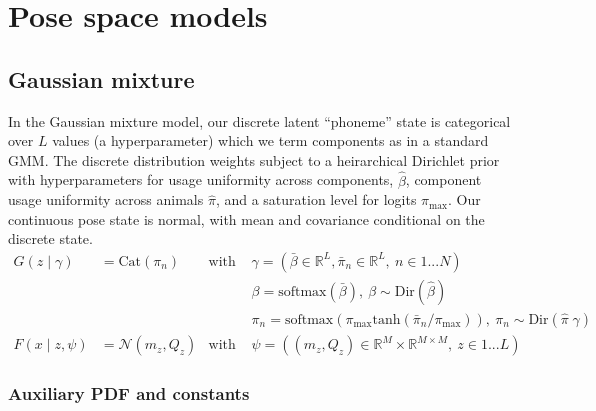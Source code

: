 \documentclass{article}         %
\newcommand{\RR}{\mathbb{R}}
\newcommand{\NN}{\mathcal{N}}
\newcommand{\pn}[1]{\left( #1 \right)}
\begin{document}
\section{Pose space models}


\subsection{Gaussian mixture}

In the Gaussian mixture model, our discrete latent ``phoneme'' state is categorical over $L$ values  (a hyperparameter) which we term components as in a standard GMM. The discrete distribution weights subject to a heirarchical Dirichlet prior with hyperparameters for usage uniformity across components, $\hat\beta$, component usage uniformity across animals $\hat\pi$, and a saturation level for logits $\pi_{\text{max}}$. Our continuous pose state is normal, with mean and covariance conditional on the discrete state.
\begin{align*}
    G\pn{z \mid \gamma} &= \text{Cat}(\pi_n) & \text{with\ }&\gamma = (\bar\beta\in \RR^L, \bar\pi_n \in \RR^L,\ n\in1...N) \\
    &&& \beta = \text{softmax}(\bar\beta),\ \beta \sim \text{Dir}(\hat\beta) \\
    &&& \pi_n = \text{softmax}( \pi_{\text{max}}\text{tanh}( \bar\pi_n / \pi_{\text{max}})),\ \pi_n \sim \text{Dir}(\hat\pi\;\gamma) \\
    F(x \mid z, \psi) &= \NN(m_z, Q_z) & \text{with\ }&\psi = ((m_z, Q_z) \in \RR^{M} \times \RR^{M\times M},\ z\in 1 ... L)
\end{align*}


\subsubsection{Auxiliary PDF and constants}
\end{document}
